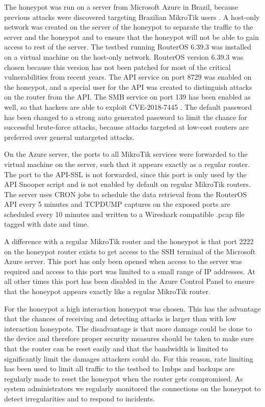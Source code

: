The honeypot was run on a server from Microsoft Azure in Brazil, because previous attacks were discovered targeting Brazilian MikroTik users \cite{MikroTikCryptoHack:PCMAG:2018}. A host-only network was created on the server of the honeypot to separate the traffic to the server and the honeypot and to ensure that the honeypot will not be able to gain access to rest of the server. The testbed running RouterOS 6.39.3 was installed on a virtual machine on the host-only network. RouterOS version 6.39.3 was chosen because this version has not been patched for most of the critical vulnerabilities from recent years. The API service on port 8729 was enabled on the honeypot, and a special user for the API was created to distinguish attacks on the router from the API. The SMB service on port 139 has been enabled as well, so that hackers are able to exploit CVE-2018-7445 \cite{CVE-2018-7445:CORESEC:2018}. The default password has been changed to a strong auto generated password to limit the chance for successful brute-force attacks, because attacks targeted at low-cost routers are preferred over general untargeted attacks.

On the Azure server, the ports to all MikroTik services were forwarded to the virtual machine on the server, such that it appears exactly as a regular router. The port to the API-SSL is not forwarded, since this port is only used by the API Snooper script and is not enabled by default on regular MikroTik routers. The server uses CRON jobs to schedule the data retrieval from the RouterOS API every 5 minutes and TCPDUMP captures on the exposed ports are scheduled every 10 minutes and written to a Wireshark compatible .pcap file tagged with date and time.

A difference with a regular MikroTik router and the honeypot is that port 2222 on the honeypot router exists to get access to the SSH terminal of the Microsoft Azure server. This port has only been opened when access to the server was required and access to this port was limited to a small range of IP addresses. At all other times this port has been disabled in the Azure Control Panel to ensure that the honeypot appears exactly like a regular MikroTik router.

For the honeypot a high interaction honeypot was chosen. This has the advantage that the chances of receiving and detecting attacks is larger than with low interaction honeypots. The disadvantage is that more damage could be done to the device and therefore proper security measures should be taken to make sure that the router can be reset easily and that the bandwidth is limited to significantly limit the damages attackers could do. For this reason, rate limiting has been used to limit all traffic to the testbed to 1mbps and backups are regularly made to reset the honeypot when the router gets compromised. As system administrators we regularly monitored the connections on the honeypot to detect irregularities and to respond to incidents. 